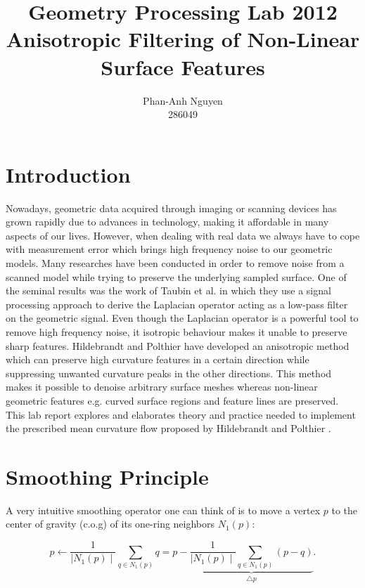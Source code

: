 \documentclass[11pt]{article}
\author{Phan-Anh Nguyen\\
		286049}
\title{Geometry Processing Lab 2012\\
	   Anisotropic Filtering of Non-Linear Surface Features}
\begin{document}
\maketitle



\section{Introduction}

Nowadays, geometric data acquired through imaging or scanning devices has grown rapidly due to advances in technology, making it affordable in many aspects of our lives. However, when dealing with real data we always have to cope with measurement error which brings high frequency noise to our geometric models. Many researches have been conducted in order to remove noise from a scanned model while trying to preserve the underlying sampled surface. One of the seminal results was the work of Taubin et al. \cite{Taubin:1995:SPA:218380.218473} in which they use a signal processing approach to derive the Laplacian operator acting as a low-pass filter on the geometric signal. Even though the Laplacian operator is a powerful tool to remove high frequency noise, it isotropic behaviour makes it unable to preserve sharp features. Hildebrandt and Polthier \cite{Hildebrandt04anisotropicfiltering} have developed an anisotropic method which can preserve high curvature features in a certain direction while suppressing unwanted curvature peaks in the other directions. This method makes it possible to denoise arbitrary surface meshes whereas non-linear geometric features e.g. curved surface regions and feature lines are preserved. This lab report explores and elaborates theory and practice needed to implement the prescribed mean curvature flow proposed by Hildebrandt and Polthier \cite{Hildebrandt04anisotropicfiltering}.

\section{Smoothing Principle}

A very intuitive smoothing operator one can think of is to move a vertex $p$ to the center of gravity (c.o.g) of its one-ring neighbors $N_1(p)$:

\begin{equation}
p \leftarrow \frac{1}{\mid N_1(p) \mid}\sum\limits_{q \in N_1(p)}q = p - \underbrace{\frac{1}{\mid N_1(p) \mid}\sum\limits_{q \in N_1(p)}(p - q)}_{\bigtriangleup p}.
\label{eq:update}
\end{equation}
\end{document}

